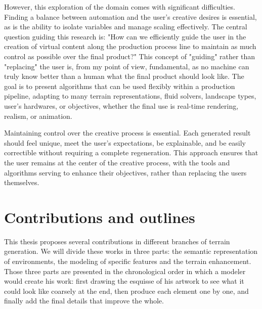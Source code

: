 However, this exploration of the domain comes with significant difficulties. Finding a balance between automation and the user's creative desires is essential, as is the ability to isolate variables and manage scaling effectively. 
The central question guiding this research is: "How can we efficiently guide the user in the creation of virtual content along the production process line to maintain as much control as possible over the final product?" This concept of "guiding" rather than "replacing" the user is, from my point of view, fundamental, as no machine can truly know better than a human what the final product should look like. The goal is to present algorithms that can be used flexibly within a production pipeline, adapting to many terrain representations, fluid solvers, landscape types, user's hardwares, or objectives, whether the final use is real-time rendering, realism, or animation.

Maintaining control over the creative process is essential. Each generated result should feel unique, meet the user's expectations, be explainable, and be easily correctible without requiring a complete regeneration. This approach ensures that the user remains at the center of the creative process, with the tools and algorithms serving to enhance their objectives, rather than replacing the users themselves.

\section{Contributions and outlines}
This thesis proposes several contributions in different branches of terrain generation. We will divide these works in three parts: the semantic representation of environments, the modeling of specific features and the terrain enhancement. Those three parts are presented in the chronological order in which a modeler would create his work: first drawing the esquisse of his artwork to see what it could look like coarsely at the end, then produce each element one by one, and finally add the final details that improve the whole. 

